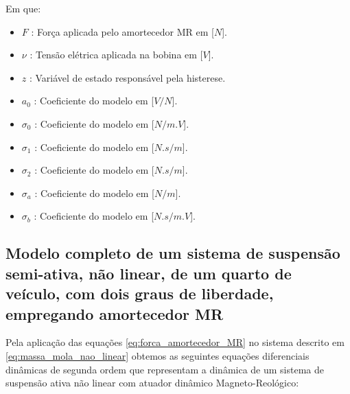 \documentclass[a4paper]{ifacconf}
\begin{document}
    Em que:
    
    \begin{itemize}
        \item $F$ : Força aplicada pelo amortecedor MR em [$N$].
        \item $\nu$ : Tensão elétrica aplicada na bobina em [$V$].
        \item $z$ : Variável de estado responsável pela histerese.
        \item $a_{0}$ : Coeficiente do modelo em [${V}/{N}$].
        \item $\sigma_{0}$ : Coeficiente do modelo em [${N}/{m.V}$].
        \item $\sigma_{1}$ : Coeficiente do modelo em [${N.s}/{m}$].
        \item $\sigma_{2}$ : Coeficiente do modelo em [${N.s}/{m}$].
        \item $\sigma_{a}$ : Coeficiente do modelo em [${N}/{m}$].
        \item $\sigma_{b}$ : Coeficiente do modelo em [${N.s}/{m.V}$].
    \end{itemize}
    
    \subsection{Modelo completo de um sistema de suspensão semi-ativa, não linear, de um quarto de veículo, com dois graus de liberdade, empregando amortecedor MR}
    
    Pela aplicação das equações \ref{eq:forca_amortecedor_MR} no sistema descrito em \ref{eq:massa_mola_nao_linear} obtemos as seguintes equações diferenciais dinâmicas de segunda ordem que representam a dinâmica de um sistema de suspensão ativa não linear com atuador dinâmico Magneto-Reológico: 
    
\end{document}
